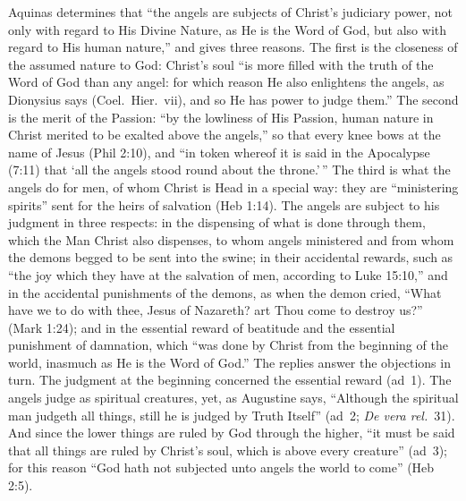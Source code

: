 Aquinas determines that ``the angels are subjects of Christ's judiciary
power, not only with regard to His Divine Nature, as He is the Word of God,
but also with regard to His human nature,'' and gives three reasons. The
first is the closeness of the assumed nature to God: Christ's soul ``is more
filled with the truth of the Word of God than any angel: for which reason He
also enlightens the angels, as Dionysius says (Coel.\ Hier.\ vii), and so He
has power to judge them.'' The second is the merit of the Passion: ``by the
lowliness of His Passion, human nature in Christ merited to be exalted above
the angels,'' so that every knee bows at the name of Jesus (Phil 2:10), and
``in token whereof it is said in the Apocalypse (7:11) that `all the angels
stood round about the throne.'\,'' The third is what the angels do for men,
of whom Christ is Head in a special way: they are ``ministering spirits''
sent for the heirs of salvation (Heb 1:14). The angels are subject to his
judgment in three respects: in the dispensing of what is done through
them, which the Man Christ also dispenses, to whom angels ministered and
from whom the demons begged to be sent into the swine; in their accidental
rewards, such as ``the joy which they have at the salvation of men,
according to Luke 15:10,'' and in the accidental punishments of the demons,
as when the demon cried, ``What have we to do with thee, Jesus of Nazareth?
art Thou come to destroy us?'' (Mark 1:24); and in the essential reward of
beatitude and the essential punishment of damnation, which ``was done by
Christ from the beginning of the world, inasmuch as He is the Word of God.''
The replies answer the objections in turn. The judgment at the beginning
concerned the essential reward (ad~1). The angels judge as spiritual
creatures, yet, as Augustine says, ``Although the spiritual man judgeth all
things, still he is judged by Truth Itself'' (ad~2; \emph{De vera rel.}\
31). And since the lower things are ruled by God through the higher, ``it
must be said that all things are ruled by Christ's soul, which is above
every creature'' (ad~3); for this reason ``God hath not subjected unto
angels the world to come'' (Heb 2:5).

